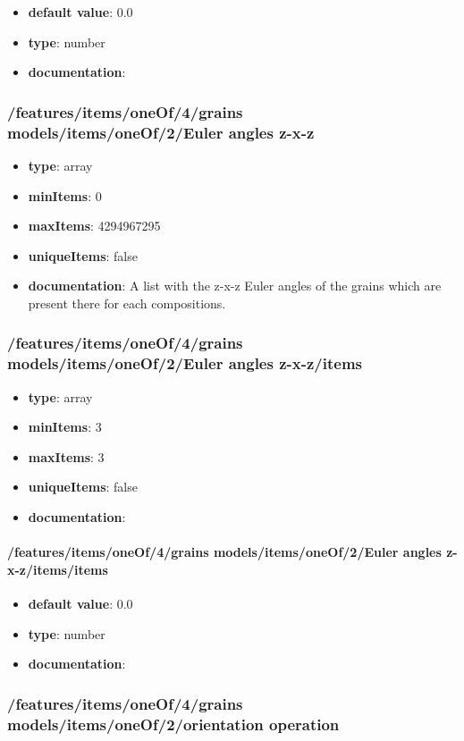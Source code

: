 \begin{itemize}\item {\bf default value}: 0.0
\item {\bf type}: number
\item {\bf documentation}: 
\end{itemize}\subsubsection{/features/items/oneOf/4/grains models/items/oneOf/2/Euler angles z-x-z}
\begin{itemize}\item {\bf type}: array
\item {\bf minItems}: 0
\item {\bf maxItems}: 4294967295
\item {\bf uniqueItems}: false
\item {\bf documentation}: A list with the z-x-z Euler angles of the grains which are present there for each compositions.
\end{itemize}\subsubsection{/features/items/oneOf/4/grains models/items/oneOf/2/Euler angles z-x-z/items}
\begin{itemize}\item {\bf type}: array
\item {\bf minItems}: 3
\item {\bf maxItems}: 3
\item {\bf uniqueItems}: false
\item {\bf documentation}: 
\end{itemize}\paragraph{/features/items/oneOf/4/grains models/items/oneOf/2/Euler angles z-x-z/items/items}
\begin{itemize}\item {\bf default value}: 0.0
\item {\bf type}: number
\item {\bf documentation}: 
\end{itemize}\subsubsection{/features/items/oneOf/4/grains models/items/oneOf/2/orientation operation}
